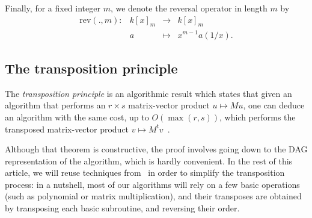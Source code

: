 \documentclass{sig-alternate}
\def\rev {\ensuremath{\mathrm{rev}}}
\newcounter{algo}
\newcommand{\ang}[1]{\langle#1\rangle}
\begin{document}
Finally, for a fixed integer $m$, we denote the reversal operator in
length $m$ by
$$
\begin{array}{cccc}
\rev(.,m): &k[x]_m &\to& k[x]_m  \\
& a & \mapsto & x^{m-1} a(1/x).
\end{array}$$ 


\subsection{The transposition principle}
\label{sec:algor-dual-basis}

The {\em transposition principle} is an algorithmic result which
states that given an algorithm that performs an $r \times s$
matrix-vector product $u \mapsto M u$, one can deduce an algorithm
with the same cost, up to $O(\max(r,s))$, which performs the
transposed matrix-vector product $v \mapsto M^t
v$~\cite[Ch.~13]{burgisser+clausen-shokrollahi}.

Although that theorem is constructive, the proof involves going down
to the DAG representation of the algorithm, which is hardly
convenient.  In the rest of this article, we will reuse techniques
from~\cite{bostan+lecerf+schost:tellegen} in order to simplify the
transposition process: in a nutshell, most of our algorithms will rely
on a few basic operations (such as polynomial or matrix
multiplication), and their transposes are obtained by transposing each
basic subroutine, and reversing their order.


\end{document}
